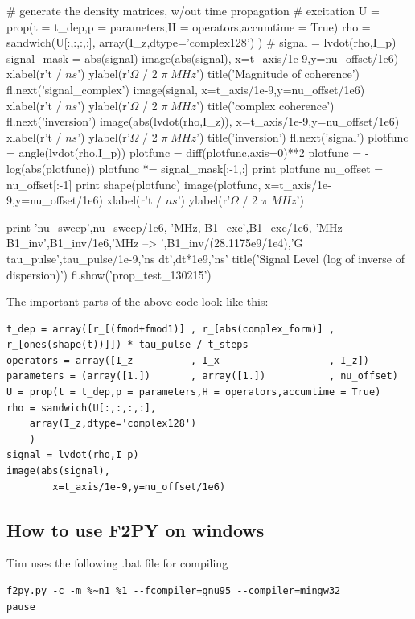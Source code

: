 \begin{python}
# generate the density matrices, w/out time propagation
#{{{ excitation
U = prop(t = t_dep,p = parameters,H = operators,accumtime = True)
rho = sandwich(U[:,:,:,:],
	array(I_z,dtype='complex128')
	)
#}}}
signal = lvdot(rho,I_p)
signal_mask = abs(signal)
image(abs(signal),
		x=t_axis/1e-9,y=nu_offset/1e6)
xlabel(r't / $ns$')
ylabel(r'$\Omega$ / 2 $\pi\;MHz$')
title('Magnitude of coherence')
fl.next('signal_complex')
image(signal,
		x=t_axis/1e-9,y=nu_offset/1e6)
xlabel(r't / $ns$')
ylabel(r'$\Omega$ / 2 $\pi\;MHz$')
title('complex coherence')
fl.next('inversion')
image(abs(lvdot(rho,I_z)),
		x=t_axis/1e-9,y=nu_offset/1e6)
xlabel(r't / $ns$')
ylabel(r'$\Omega$ / 2 $\pi\;MHz$')
title('inversion')
fl.next('signal')
plotfunc = angle(lvdot(rho,I_p))
plotfunc = diff(plotfunc,axis=0)**2
plotfunc = -log(abs(plotfunc))
plotfunc *= signal_mask[:-1,:]
print plotfunc
nu_offset = nu_offset[:-1]
print shape(plotfunc)
image(plotfunc,
		x=t_axis/1e-9,y=nu_offset/1e6)
xlabel(r't / $ns$')
ylabel(r'$\Omega$ / 2 $\pi\;MHz$')

print 'nu_sweep',nu_sweep/1e6, 'MHz, B1_exc',B1_exc/1e6, 'MHz B1_inv',B1_inv/1e6,'MHz --> ',B1_inv/(28.1175e9/1e4),'G tau_pulse',tau_pulse/1e-9,'ns dt',dt*1e9,'ns'
title('Signal Level (log of inverse of dispersion)')
fl.show('prop_test_130215')
\end{python}

The important parts of the above code look like this:

\begin{lstlisting}
t_dep = array([r_[(fmod+fmod1)] , r_[abs(complex_form)] , r_[ones(shape(t))]]) * tau_pulse / t_steps
operators = array([I_z          , I_x                   , I_z])
parameters = (array([1.])       , array([1.])           , nu_offset)
U = prop(t = t_dep,p = parameters,H = operators,accumtime = True)
rho = sandwich(U[:,:,:,:],
	array(I_z,dtype='complex128')
	)
signal = lvdot(rho,I_p)
image(abs(signal),
		x=t_axis/1e-9,y=nu_offset/1e6)
\end{lstlisting}
\subsection{How to use F2PY on windows}
Tim uses the following .bat file for compiling

\begin{verbatim}
f2py.py -c -m %~n1 %1 --fcompiler=gnu95 --compiler=mingw32
pause
\end{verbatim}

